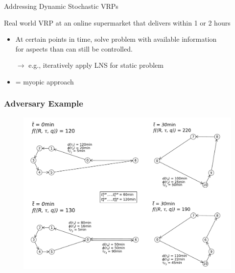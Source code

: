 \documentclass[aspectratio=1610]{beamer}
\newcommand{\important}[1]{{\color{green!60!black}#1}}
\begin{document}
\begin{frame}{Addressing Dynamic Stochastic VRPs}


\bigskip
{} \important{Real world VRP} at an online supermarket that \important{delivers within 1 or 2 hours}

\bigskip
{}

\begin{itemize}
	\itemsep2ex
	\item At certain points in time, solve problem with available information\\ for aspects than can still be controlled.
	
	\item[$\rightarrow$] e.g., iteratively apply LNS for static problem
	\item = \important{myopic approach}
\end{itemize}

\end{frame}

\begin{frame}
	\frametitle{Adversary Example}
	\begin{figure}[tb]
		\centering
		\includegraphics[width=.80\columnwidth]{graphics/illustrative_example_corrected.pdf}
	\end{figure}
\end{frame}
\end{document}

